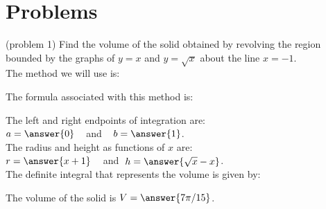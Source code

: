 \documentclass{ximera}
\begin{document}
\section{Problems}


\begin{problem}(problem 1)
Find the volume of the solid obtained by revolving the region bounded by the graphs of $y = x$ and $y = \sqrt x$ about the line $x = -1$.\\
The method we will use is:
\begin{multipleChoice}
\end{multipleChoice}

The formula associated with this method is:
\begin{multipleChoice}
\end{multipleChoice}

The left and right endpoints of integration are:\\
$a = \answer{0}\;\;\;$ and $\;\;\; b = \answer{1}$.\\
The radius and height as functions of $x$ are:\\
$r = \answer{x+1} \;\;\;$ and $\; h = \answer{\sqrt{x} - x}$.\\

The definite integral that represents the volume is given by:\\
\begin{multipleChoice}
\end{multipleChoice}

The volume of the solid is $V = \answer{7\pi/15}$.

\end{problem}
\end{document}
